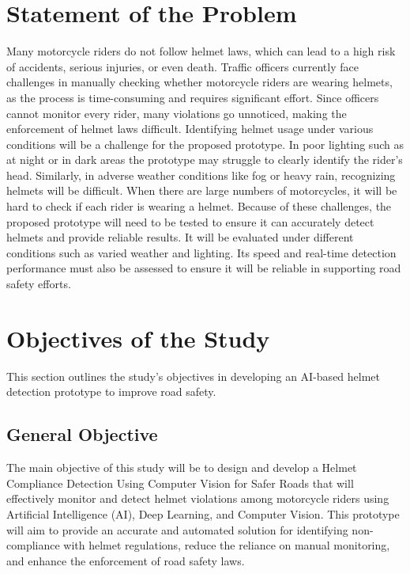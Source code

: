 \begin{refsection}
\section{Statement of the Problem}

Many motorcycle riders do not follow helmet laws, which can lead to a high risk of accidents, serious injuries, or even death. Traffic officers currently face challenges in manually checking whether motorcycle riders are wearing helmets, as the process is time-consuming and requires significant effort. Since officers cannot monitor every rider, many violations go unnoticed, making the enforcement of helmet laws difficult. Identifying helmet usage under various conditions will be a challenge for the proposed prototype. In poor lighting such as at night or in dark areas the prototype may struggle to clearly identify the rider’s head. Similarly, in adverse weather conditions like fog or heavy rain, recognizing helmets will be difficult. When there are large numbers of motorcycles, it will be hard to check if each rider is wearing a helmet. Because of these challenges, the proposed prototype will need to be tested to ensure it can accurately detect helmets and provide reliable results. It will be evaluated under different conditions such as varied weather and lighting. Its speed and real-time detection performance must also be assessed to ensure it will be reliable in supporting road safety efforts.

\section{Objectives of the Study}
This section outlines the study’s objectives in developing an AI-based helmet detection prototype to improve road safety.

\subsection{General Objective}

The main objective of this study will be to design and develop a Helmet Compliance Detection Using Computer Vision for Safer Roads that will effectively monitor and detect helmet violations among motorcycle riders using Artificial Intelligence (AI), Deep Learning, and Computer Vision. This prototype will aim to provide an accurate and automated solution for identifying non-compliance with helmet regulations, reduce the reliance on manual monitoring, and enhance the enforcement of road safety laws.


\end{refsection}

